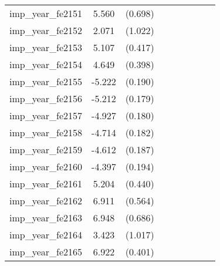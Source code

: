 {\begin{tabular}{l*{4}{cc}}
imp\_year\_fe2151&    5.560\sym{***}&  (0.698)&                  &         &                  &         &                  &         \\
imp\_year\_fe2152&    2.071\sym{*}  &  (1.022)&                  &         &                  &         &                  &         \\
imp\_year\_fe2153&    5.107\sym{***}&  (0.417)&                  &         &                  &         &                  &         \\
imp\_year\_fe2154&    4.649\sym{***}&  (0.398)&                  &         &                  &         &                  &         \\
imp\_year\_fe2155&   -5.222\sym{***}&  (0.190)&                  &         &                  &         &                  &         \\
imp\_year\_fe2156&   -5.212\sym{***}&  (0.179)&                  &         &                  &         &                  &         \\
imp\_year\_fe2157&   -4.927\sym{***}&  (0.180)&                  &         &                  &         &                  &         \\
imp\_year\_fe2158&   -4.714\sym{***}&  (0.182)&                  &         &                  &         &                  &         \\
imp\_year\_fe2159&   -4.612\sym{***}&  (0.187)&                  &         &                  &         &                  &         \\
imp\_year\_fe2160&   -4.397\sym{***}&  (0.194)&                  &         &                  &         &                  &         \\
imp\_year\_fe2161&    5.204\sym{***}&  (0.440)&                  &         &                  &         &                  &         \\
imp\_year\_fe2162&    6.911\sym{***}&  (0.564)&                  &         &                  &         &                  &         \\
imp\_year\_fe2163&    6.948\sym{***}&  (0.686)&                  &         &                  &         &                  &         \\
imp\_year\_fe2164&    3.423\sym{***}&  (1.017)&                  &         &                  &         &                  &         \\
imp\_year\_fe2165&    6.922\sym{***}&  (0.401)&                  &         &                  &         &                  &         \\

\end{tabular}}
